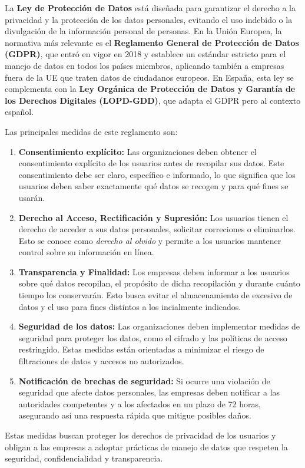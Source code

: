 \documentclass{article}
\begin{document}
La \textbf{Ley de Protección de Datos} está diseñada para garantizar el derecho a la privacidad y 
la protección de los datos personales, evitando el uso indebido o la divulgación de la información 
personal de personas. En la Unión Europea, la normativa más relevante es el 
\textbf{Reglamento General de Protección de Datos (GDPR)}, que entró en vigor en 2018 y 
establece un estándar estricto para el manejo de datos en todos los países miembros, aplicando también 
a empresas fuera de la UE que traten datos de ciudadanos europeos. En España, esta ley se complementa con 
la \textbf{Ley Orgánica de Protección de Datos y Garantía de los Derechos Digitales (LOPD-GDD)}, que adapta
el GDPR pero al contexto español.

Las principales medidas de este reglamento son:
\begin{enumerate}
    \item \textbf{Consentimiento explícito:} Las organizaciones deben obtener el consentimiento explícito de los usuarios antes de recopilar sus datos. Este consentimiento debe ser claro, específico e informado, lo que significa que los usuarios deben saber exactamente qué datos se recogen y para qué fines se usarán.
    \item \textbf{Derecho al Acceso, Rectificación y Supresión:} Los usuarios tienen el derecho de acceder a sus datos personales, solicitar correciones o eliminarlos. Esto se conoce como \textit{derecho al olvido} y permite a los usuarios mantener control sobre su información en línea.
    \item \textbf{Transparencia y Finalidad:} Los empresas deben informar a los usuarios sobre qué datos recopilan, el propósito de dicha recopilación y durante cuánto tiempo los conservarán. Esto busca evitar el almacenamiento de excesivo de datos y el uso para fines distintos a los incialmente indicados.
    \item \textbf{Seguridad de los datos:} Las organizaciones deben implementar medidas de seguridad para proteger los datos, como el cifrado y las políticas de acceso restringido. Estas medidas están orientadas a minimizar el riesgo de filtraciones de datos y accesos no autorizados.
    \item \textbf{Notificación de brechas de seguridad:} Si ocurre una violación de seguridad que afecte datos personales, las empresas deben notificar a las autoridades competentes y a los afectados en un plazo de 72 horas, asegurando así una respuesta rápida que mitigue posibles daños.
\end{enumerate}

Estas medidas buscan proteger los derechos de privacidad de los usuarios y obligan a las empresas a adoptar prácticas de manejo de datos que respeten la seguridad, confidencialidad y transparencia.
\end{document}
